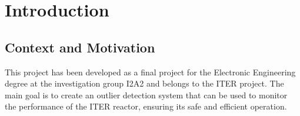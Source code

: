 \chapter{Introduction} \label{sec:cap1}

\section{Context and Motivation}

This project has been developed as a final project for the Electronic Engineering degree at the investigation group \ac{I2A2} and belongs to the \ac{ITER} project. The main goal is to create an outlier detection system that can be used to monitor the performance of the \ac{ITER} reactor, ensuring its safe and efficient operation.

